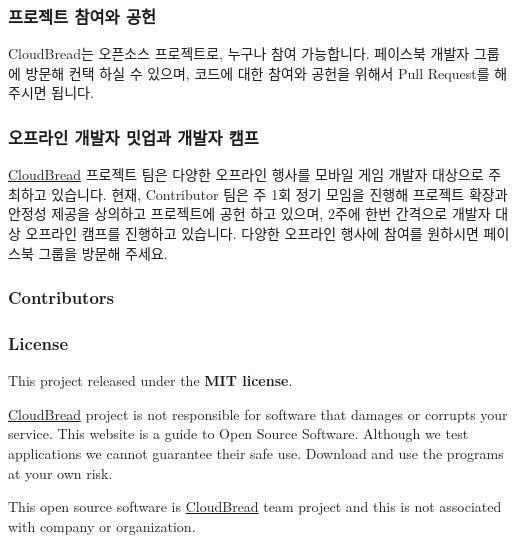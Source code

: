\subsubsection*{프로젝트 참여와 공헌}

Cloud\+Bread는 오픈소스 프로젝트로, 누구나 참여 가능합니다. 페이스북 개발자 그룹에 방문해 컨택 하실 수 있으며, 코드에 대한 참여와 공헌을 위해서 Pull Request를 해주시면 됩니다.

\subsubsection*{오프라인 개발자 밋업과 개발자 캠프}

\hyperlink{a00217}{Cloud\+Bread} 프로젝트 팀은 다양한 오프라인 행사를 모바일 게임 개발자 대상으로 주최하고 있습니다. 현재, Contributor 팀은 주 1회 정기 모임을 진행해 프로젝트 확장과 안정성 제공을 상의하고 프로젝트에 공헌 하고 있으며, 2주에 한번 간격으로 개발자 대상 오프라인 캠프를 진행하고 있습니다. 다양한 오프라인 행사에 참여를 원하시면 페이스북 그룹을 방문해 주세요.

\subsubsection*{Contributors}

\href{https://github.com/CloudBreadPaPa}{\tt } \href{https://github.com/yshong93}{\tt } \href{https://github.com/junghyun4425}{\tt } \href{https://github.com/Beingbook}{\tt } \href{https://github.com/finesunday}{\tt } \href{https://github.com/style0912}{\tt }

\subsubsection*{License}


\begin{DoxyItemize}
\item This project released under the {\bfseries M\+IT license}.
\item \hyperlink{a00217}{Cloud\+Bread} project is not responsible for software that damages or corrupts your service. This website is a guide to Open Source Software. Although we test applications we cannot guarantee their safe use. Download and use the programs at your own risk.
\item This open source software is \hyperlink{a00217}{Cloud\+Bread} team project and this is not associated with company or organization. 
\end{DoxyItemize}